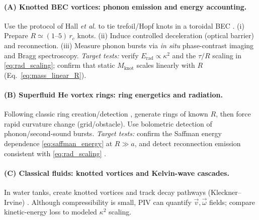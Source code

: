 \documentclass[a4paper,12pt]{article}
\begin{document}
    \paragraph{(A) Knotted BEC vortices: phonon emission and energy accounting.}
    Use the protocol of Hall \emph{et al.} to tie trefoil/Hopf knots in a toroidal BEC \cite{Hall2016}.
    (i) Prepare $R\simeq (1\text{--}5)\,r_c$ knots.
    (ii) Induce controlled deceleration (optical barrier) and reconnection.
    (iii) Measure phonon bursts via \emph{in situ} phase-contrast imaging and Bragg spectroscopy.
    \emph{Target tests:} verify $E_\text{rad}\propto \kappa^2$ and the $\tau/R$ scaling in \eqref{eq:rad_scaling}; confirm that static $M_\text{knot}$ scales linearly with $R$ (Eq.~\eqref{eq:mass_linear_R}).

    \paragraph{(B) Superfluid He vortex rings: ring energetics and radiation.}
    Following classic ring creation/detection \cite{RayfieldReif1964}, generate rings of known $R$, then force rapid curvature change (grid/obstacle). Use bolometric detection of phonon/second-sound bursts.
    \emph{Target tests:} confirm the Saffman energy dependence \eqref{eq:saffman_energy} at $R\gg a$, and detect reconnection emission consistent with \eqref{eq:rad_scaling} \cite{Leadbeater2001}.

    \paragraph{(C) Classical fluids: knotted vortices and Kelvin-wave cascades.}
    In water tanks, create knotted vortices and track decay pathways (Kleckner--Irvine) \cite{KlecknerIrvine2013}. Although compressibility is small, PIV can quantify $\vec v,\vec\omega$ fields; compare kinetic-energy loss to modeled $\kappa^2$ scaling.

    \medskip
\end{document}
